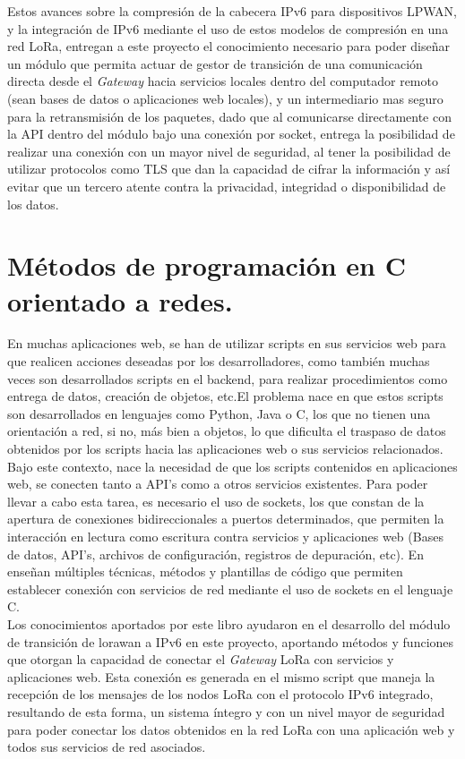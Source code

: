 \begin{justify}
Estos avances sobre la compresión de la cabecera IPv6 para dispositivos LPWAN, y la integración de IPv6 mediante el uso de estos modelos de compresión en una red LoRa, entregan a este proyecto el conocimiento necesario para poder diseñar un módulo que permita actuar de gestor de transición de una comunicación directa desde el \textit{Gateway} hacia servicios locales dentro del computador remoto (sean bases de datos o aplicaciones web locales), y un intermediario mas seguro para la retransmisión de los paquetes, dado que al comunicarse directamente con la API dentro del módulo bajo una conexión por \gls{socket}, entrega la posibilidad de realizar una conexión con un mayor nivel de seguridad, al tener la posibilidad de utilizar protocolos como TLS que dan la capacidad de cifrar la información y así evitar que un tercero atente contra la privacidad, integridad o disponibilidad de los datos.
\newpage
\section{Métodos de programación en C orientado a redes.}
En muchas aplicaciones web, se han de utilizar scripts en sus servicios web para que realicen acciones deseadas por los desarrolladores, como también muchas veces son desarrollados scripts en el backend, para realizar procedimientos como entrega de datos, creación de objetos, etc.El problema nace en que estos scripts son desarrollados en lenguajes como Python, Java o C, los que no tienen una orientación a red, si no, más bien a objetos, lo que dificulta el traspaso de datos obtenidos por los scripts hacia las aplicaciones web o sus servicios relacionados.\\
Bajo este contexto, nace la necesidad de que los scripts contenidos en aplicaciones web, se conecten tanto a API's como a otros servicios existentes. Para poder llevar a cabo esta tarea, es necesario el uso de \glspl{socket}, los que constan de la apertura de conexiones bidireccionales a puertos determinados, que permiten la interacción en lectura como escritura contra servicios y aplicaciones web (Bases de datos, API's, archivos de configuración, registros de depuración, etc). En \cite{network} enseñan múltiples técnicas, métodos y plantillas de código que permiten establecer conexión con servicios de red mediante el uso de \glspl{socket} en el lenguaje C.\\
Los conocimientos aportados por este libro ayudaron en el desarrollo del módulo de transición de \gls{lorawan} a IPv6 en este proyecto, aportando métodos y funciones que otorgan la capacidad de conectar el \textit{Gateway} LoRa con servicios y aplicaciones web. Esta conexión es generada en el mismo script que maneja la recepción de los mensajes de los nodos LoRa con el protocolo IPv6 integrado, resultando de esta forma, un sistema íntegro y con un nivel mayor de seguridad para poder conectar los datos obtenidos en la red LoRa con una aplicación web y todos sus servicios de red asociados.
\end{justify}